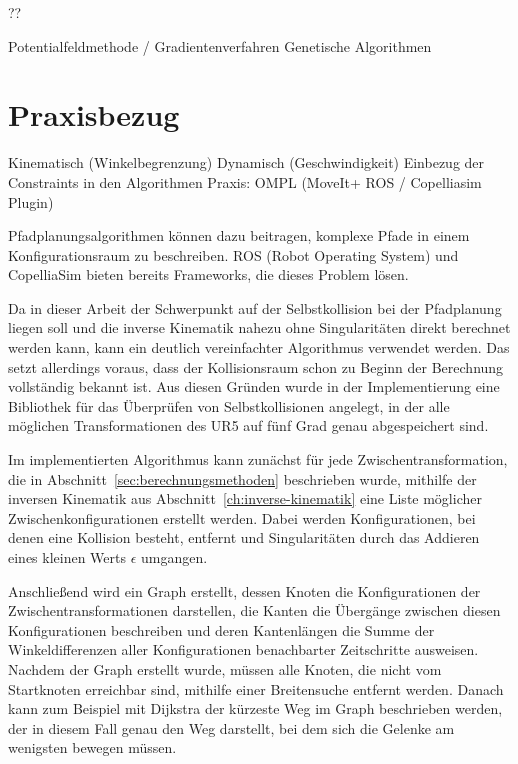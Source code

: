 ??

Potentialfeldmethode / Gradientenverfahren
Genetische Algorithmen


\section{Praxisbezug}\label{sec:praxisbezug}
Kinematisch (Winkelbegrenzung)
Dynamisch (Geschwindigkeit)
Einbezug der Constraints in den Algorithmen
Praxis: OMPL (MoveIt+ ROS / Copelliasim Plugin)

Pfadplanungsalgorithmen können dazu beitragen, komplexe Pfade in einem Konfigurationsraum zu beschreiben.
ROS (Robot Operating System) und CopelliaSim bieten bereits Frameworks, die dieses Problem lösen.

Da in dieser Arbeit der Schwerpunkt auf der Selbstkollision bei der Pfadplanung liegen soll und die inverse Kinematik nahezu ohne Singularitäten direkt berechnet werden kann, kann ein deutlich vereinfachter Algorithmus verwendet werden.
Das setzt allerdings voraus, dass der Kollisionsraum schon zu Beginn der Berechnung vollständig bekannt ist.
Aus diesen Gründen wurde in der Implementierung eine Bibliothek für das Überprüfen von Selbstkollisionen angelegt, in der alle möglichen Transformationen des UR5 auf fünf Grad genau abgespeichert sind.

Im implementierten Algorithmus kann zunächst für jede Zwischentransformation, die in Abschnitt~\ref{sec:berechnungsmethoden} beschrieben wurde, mithilfe der inversen Kinematik aus Abschnitt~\ref{ch:inverse-kinematik} eine Liste möglicher Zwischenkonfigurationen erstellt werden.
Dabei werden Konfigurationen, bei denen eine Kollision besteht, entfernt und Singularitäten durch das Addieren eines kleinen Werts $\epsilon$ umgangen.

Anschließend wird ein Graph erstellt, dessen Knoten die Konfigurationen der Zwischentransformationen darstellen, die Kanten die Übergänge zwischen diesen Konfigurationen beschreiben und deren Kantenlängen die Summe der Winkeldifferenzen aller Konfigurationen benachbarter Zeitschritte ausweisen.
Nachdem der Graph erstellt wurde, müssen alle Knoten, die nicht vom Startknoten erreichbar sind, mithilfe einer Breitensuche entfernt werden.
Danach kann zum Beispiel mit Dijkstra der kürzeste Weg im Graph beschrieben werden, der in diesem Fall genau den Weg darstellt, bei dem sich die Gelenke am wenigsten bewegen müssen.

